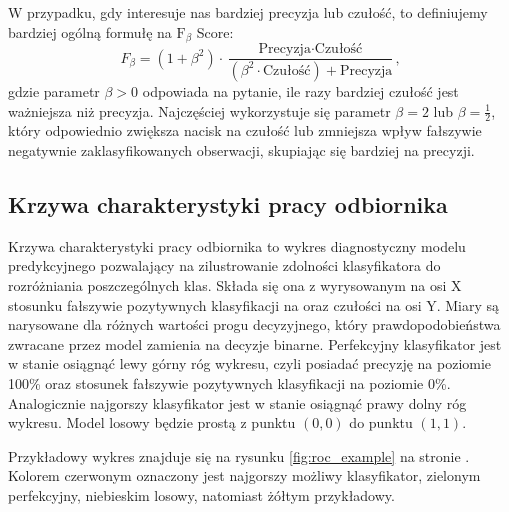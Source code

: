 \documentclass[inzynierska]{pwr_wmat_praca_dyplomowa}
\theoremstyle{plain}
\numberwithin{theorem}{chapter}
\theoremstyle{definition}
\numberwithin{theorem}{chapter}
\begin{document}
W przypadku, gdy interesuje nas bardziej precyzja lub czułość, to definiujemy bardziej ogólną formułę na $\text{F}_{\beta}$ Score:
$$ F_{\beta} = (1 + \beta^2) \cdot \frac{\text{Precyzja} \cdot \text{Czułość}}{(\beta^2 \cdot \text{Czułość}) + \text{Precyzja}} \text{,}$$
gdzie parametr $\beta>0$ odpowiada na pytanie, ile razy bardziej czułość jest ważniejsza niż precyzja. Najczęściej wykorzystuje się parametr $\beta = 2$ lub $\beta = \frac{1}{2}$, który odpowiednio zwiększa nacisk na czułość lub zmniejsza wpływ fałszywie negatywnie zaklasyfikowanych obserwacji, skupiając się bardziej na precyzji.


\subsection{Krzywa charakterystyki pracy odbiornika}
\label{ROC}

Krzywa charakterystyki pracy odbiornika to wykres diagnostyczny modelu predykcyjnego pozwalający na zilustrowanie zdolności klasyfikatora do rozróżniania poszczególnych klas. Składa się ona z wyrysowanym na osi X stosunku fałszywie pozytywnych klasyfikacji na oraz czułości na osi Y. Miary są narysowane dla różnych wartości progu decyzyjnego, który prawdopodobieństwa zwracane przez model zamienia na decyzje binarne. Perfekcyjny klasyfikator jest w stanie osiągnąć lewy górny róg wykresu, czyli posiadać precyzję na poziomie 100\% oraz stosunek fałszywie pozytywnych klasyfikacji na poziomie 0\%. Analogicznie najgorszy klasyfikator jest w stanie osiągnąć prawy dolny róg wykresu. Model losowy będzie prostą z punktu $(0,0)$ do punktu $(1,1)$. 

Przykładowy wykres znajduje się na rysunku \ref{fig:roc_example} na stronie \pageref{fig:roc_example}. Kolorem czerwonym oznaczony jest najgorszy możliwy klasyfikator, zielonym perfekcyjny, niebieskim losowy, natomiast żółtym przykładowy.
\end{document}
